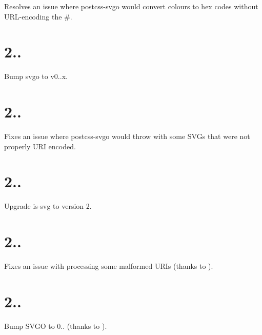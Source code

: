 
\begin{DoxyItemize}
\item Resolves an issue where postcss-\/svgo would convert colours to hex codes without U\+R\+L-\/encoding the {\ttfamily \#}.
\end{DoxyItemize}

\section*{2..}


\begin{DoxyItemize}
\item Bump svgo to v0..\+x.
\end{DoxyItemize}

\section*{2..}


\begin{DoxyItemize}
\item Fixes an issue where postcss-\/svgo would throw with some S\+V\+Gs that were not properly U\+RI encoded.
\end{DoxyItemize}

\section*{2..}


\begin{DoxyItemize}
\item Upgrade is-\/svg to version 2.
\end{DoxyItemize}

\section*{2..}


\begin{DoxyItemize}
\item Fixes an issue with processing some malformed U\+R\+Is (thanks to ).
\end{DoxyItemize}

\section*{2..}


\begin{DoxyItemize}
\item Bump S\+V\+GO to 0.. (thanks to ).
\end{DoxyItemize}

